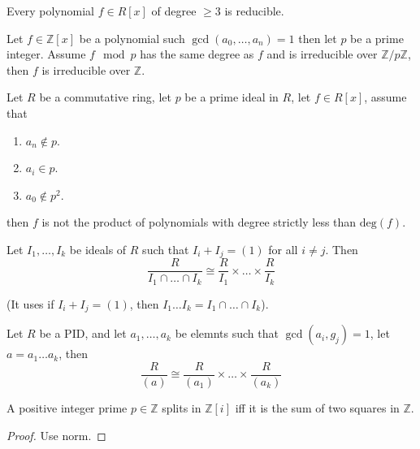 \documentclass[openany]{book}
\newcommand{\Z}{\mathbb{Z}}
\begin{document}
\begin{prop}
    Every polynomial $f\in R[x]$ of degree $\geq 3$ is reducible.
\end{prop}

\begin{prop}
    Let $f\in\Z[x]$ be a polynomial such $\gcd(a_0,\dots, a_n)=1$ then let $p$ be a prime integer. Assume $f\mod p$ has the same degree as $f$ and is irreducible over $\Z/p\Z$, then $f$ is irreducible over $\Z$.
\end{prop}

\begin{prop}
    Let $R$ be a commutative ring, let $p$ be a prime ideal in $R$, let $f\in R[x]$, assume that 
    \begin{enumerate}
        \item $a_n\not\in p$.
        \item $a_i\in p$.
        \item $a_0\not\in p^2$.
    \end{enumerate}
    then $f$ is not the product of polynomials with degree strictly less than $\text{deg}(f)$.
\end{prop}


\begin{thm}[CRT]
    Let $I_1,\dots, I_k$ be ideals of $R$ such that $I_i+I_j=(1)$ for all $i\neq j$. Then 
    \begin{equation*}
        \frac{R}{I_1\cap\dots\cap I_k}\cong\frac{R}{I_1}\times\dots\times\frac{R}{I_k}
    \end{equation*}

    (It uses if $I_i+I_j=(1)$, then $I_1\dots I_k=I_1\cap\dots\cap I_k$).
\end{thm}

\begin{cor}
    Let $R$ be a PID, and let $a_1,\dots, a_k$ be elemnts such that $\gcd(a_i,g_j)=1$, let $a=a_1\dots a_k$, then 
    \begin{equation*}
        \frac{R}{(a)}\cong\frac{R}{(a_1)}\times\dots\times\frac{R}{(a_k)}
    \end{equation*}
\end{cor}


\begin{prop}
    A positive integer prime $p\in\Z$ splits in $\Z[i]$ iff it is the sum of two squares in $\Z$.
\end{prop}
\begin{proof}
    Use norm.
\end{proof}
\end{document}
